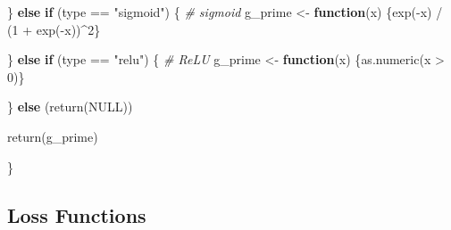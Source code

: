 \documentclass[
]{book}
\newenvironment{Shaded}{\begin{snugshade}}{\end{snugshade}}
\newcommand{\CommentTok}[1]{\textcolor[rgb]{0.56,0.35,0.01}{\textit{#1}}}
\newcommand{\ConstantTok}[1]{\textcolor[rgb]{0.00,0.00,0.00}{#1}}
\newcommand{\ControlFlowTok}[1]{\textcolor[rgb]{0.13,0.29,0.53}{\textbf{#1}}}
\newcommand{\DecValTok}[1]{\textcolor[rgb]{0.00,0.00,0.81}{#1}}
\newcommand{\FunctionTok}[1]{\textcolor[rgb]{0.00,0.00,0.00}{#1}}
\newcommand{\NormalTok}[1]{#1}
\newcommand{\OtherTok}[1]{\textcolor[rgb]{0.56,0.35,0.01}{#1}}
\newcommand{\SpecialCharTok}[1]{\textcolor[rgb]{0.00,0.00,0.00}{#1}}
\newcommand{\StringTok}[1]{\textcolor[rgb]{0.31,0.60,0.02}{#1}}
\begin{document}
\begin{Shaded}
\begin{Highlighting}[]
\NormalTok{  \} }\ControlFlowTok{else} \ControlFlowTok{if}\NormalTok{ (type }\SpecialCharTok{==} \StringTok{"sigmoid"}\NormalTok{) \{}
    \CommentTok{\# sigmoid}
\NormalTok{    g\_prime }\OtherTok{\textless{}{-}} \ControlFlowTok{function}\NormalTok{(x) \{}\FunctionTok{exp}\NormalTok{(}\SpecialCharTok{{-}}\NormalTok{x) }\SpecialCharTok{/}\NormalTok{ (}\DecValTok{1} \SpecialCharTok{+} \FunctionTok{exp}\NormalTok{(}\SpecialCharTok{{-}}\NormalTok{x))}\SpecialCharTok{\^{}}\DecValTok{2}\NormalTok{\}}
    
\NormalTok{  \} }\ControlFlowTok{else} \ControlFlowTok{if}\NormalTok{ (type }\SpecialCharTok{==} \StringTok{"relu"}\NormalTok{) \{}
    \CommentTok{\# ReLU}
\NormalTok{    g\_prime }\OtherTok{\textless{}{-}} \ControlFlowTok{function}\NormalTok{(x) \{}\FunctionTok{as.numeric}\NormalTok{(x }\SpecialCharTok{\textgreater{}} \DecValTok{0}\NormalTok{)\}}
    
\NormalTok{  \} }\ControlFlowTok{else}\NormalTok{ (}\FunctionTok{return}\NormalTok{(}\ConstantTok{NULL}\NormalTok{))}
  
  \FunctionTok{return}\NormalTok{(g\_prime)}

\NormalTok{\}}
\end{Highlighting}
\end{Shaded}

\hypertarget{loss-functions-1}{%
\subsection{Loss Functions}\label{loss-functions-1}}
\end{document}
